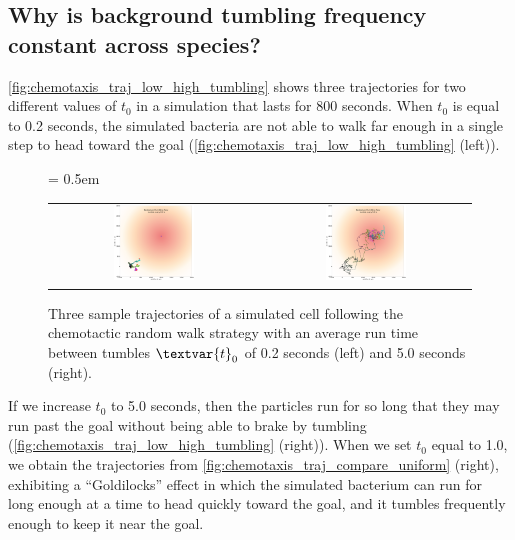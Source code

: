 \FloatBarrier
{}
\subsection{Why is background tumbling frequency constant across species?}

\autoref{fig:chemotaxis_traj_low_high_tumbling} shows three trajectories for two different values of $t_0$ in a simulation that lasts for 800 seconds. When $t_0$ is equal to 0.2 seconds, the simulated bacteria are not able to walk far enough in a single step to head toward the goal (\autoref{fig:chemotaxis_traj_low_high_tumbling} (left)).\\

\begin{figure}[h]
\centering
\mySfFamily
\tabcolsep = 0.5em
\begin{tabular}{c c}
\includegraphics[width = 0.4\textwidth]{../images/chemotaxis_traj_0.2_uniform.png} & \includegraphics[width = 0.4\textwidth]{../images/chemotaxis_traj_5.0_uniform.png}
\end{tabular}
\caption{Three sample trajectories of a simulated cell following the chemotactic random walk strategy with an average run time between tumbles $\textvar{t}_\text{0}$ of 0.2 seconds (left) and 5.0 seconds (right).}
\label{fig:chemotaxis_traj_low_high_tumbling}
\end{figure}

 If we increase $t_0$ to 5.0 seconds, then the particles run for so long that they may run past the goal without being able to brake by tumbling (\autoref{fig:chemotaxis_traj_low_high_tumbling} (right)). When we set $t_0$ equal to 1.0, we obtain the trajectories from \autoref{fig:chemotaxis_traj_compare_uniform} (right), exhibiting a ``Goldilocks'' effect in which the simulated bacterium can run for long enough at a time to head quickly toward the goal, and it tumbles frequently enough to keep it near the goal.


